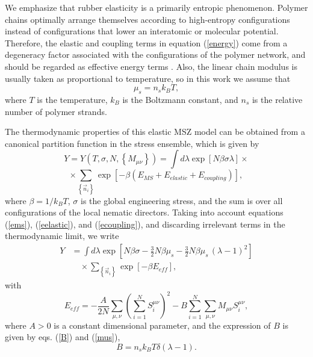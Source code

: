 \documentclass[aps,pre,reprint,amsmath,amssymbols,superscriptaddress,
nofootinbib]{revtex4-1}
\begin{document}
We emphasize that rubber elasticity is a primarily entropic phenomenon.
Polymer chains optimally arrange themselves according to high-entropy
configurations instead of configurations that lower an interatomic or
molecular potential. Therefore, the elastic and coupling terms in equation
(\ref{energy}) come from a degeneracy factor associated with the
configurations of the polymer network, and should be regarded as effective
energy terms \cite{Liarte2011,Liarte2013}. Also, the linear chain
modulus is usually taken as proportional to temperature, so in this work we
assume that%
\begin{equation}
\mu_{s}=n_{s}k_{B}T,\label{mus}%
\end{equation}
where $T$ is the temperature, $k_{B}$ is the Boltzmann constant, and $n_{s}$
is the relative number of polymer strands.

The thermodynamic properties of this elastic MSZ model can be obtained from a
canonical partition function in the stress ensemble, which is given by%
\[
Y=Y\left(  T,\sigma,N,\left\{  M_{\mu\nu}\right\}  \right)  =\int d\lambda
\exp\left[  N\beta\sigma\lambda\right]  \times
\]%
\begin{equation}
\times\sum_{\left\{  \overrightarrow{n}_{i}\right\}  }\exp\left[
-\beta\left(  E_{MS}+E_{elastic}+E_{coupling}\right)  \right]  ,
\end{equation}
where $\beta=1/k_{B}T$, $\sigma$ is the global engineering stress, and the sum
is over all configurations of the local nematic directors. Taking into account
equations (\ref{ems}), (\ref{eelastic}), and (\ref{ecoupling}), and discarding
irrelevant terms in the thermodynamic limit, we write%
\begin{align}
Y &= \int d\lambda\exp\left[  N\beta\sigma-\frac{3}{2}N\beta\mu_{s}-\frac{3}%
{2}N\beta\mu_{s}\,\left(  \lambda-1\right)  ^{2}\right]
\nonumber \\
& \quad \times \sum_{\left\{
\overrightarrow{n}_{i}\right\}  }\exp\left[  -\beta E_{eff}\right]  ,
\end{align}
with%
\begin{equation}
E_{eff}=-\frac{A}{2N}\sum_{\mu,\nu}\left(  \sum_{i=1}^{N}S_{i}^{\mu\nu
}\right)  ^{2}-B\sum_{i=1}^{N}\sum_{\mu,\nu}M_{\mu\nu}S_{i}^{\mu\nu},
\end{equation}
where $A>0$ is a constant dimensional parameter, and the expression of $B$ is
given by eqs. (\ref{B}) and (\ref{mus}),%
\begin{equation}
B=n_{s}k_{B}T\delta\left(  \lambda-1\right) \label{BB}.%
\end{equation}
\end{document}
